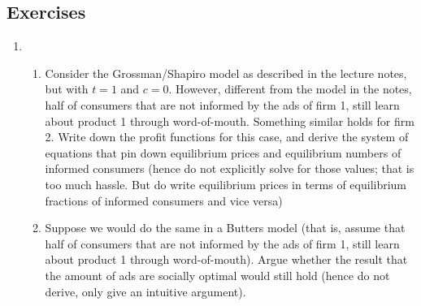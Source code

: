 \subsection{Exercises}
\begin{enumerate}
	\item
	      \begin{enumerate}
		      \item Consider the Grossman/Shapiro model as described in the lecture notes, but
		            with $t = 1$ and $c = 0$. However, different from the model in the notes, half of
		            consumers that are not informed by the ads of firm 1, still learn about product
		            1 through word-of-mouth. Something similar holds for firm 2. Write down the
		            profit functions for this case, and derive the system of equations that pin down
		            equilibrium prices and equilibrium numbers of informed consumers (hence do
		            not explicitly solve for those values; that is too much hassle. But do write
		            equilibrium prices in terms of equilibrium fractions of informed consumers and
		            vice versa)
		      \item Suppose we would do the same in a Butters model (that is, assume that
		            half of consumers that are not informed by the ads of firm 1, still learn about
		            product 1 through word-of-mouth). Argue whether the result that the amount
		            of ads are socially optimal would still hold (hence do not derive, only give an
		            intuitive argument).
	      \end{enumerate}


\end{enumerate}
